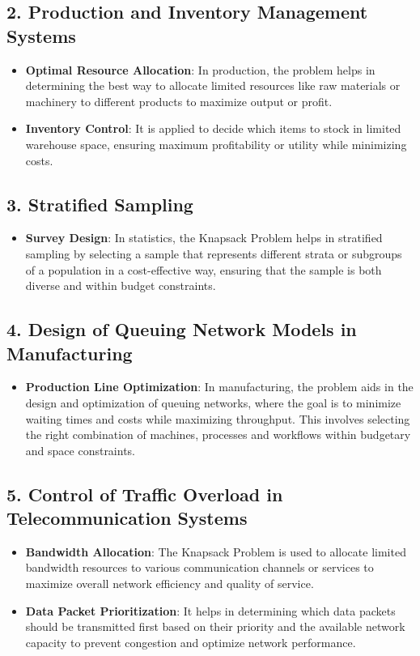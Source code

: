 \documentclass{llncs}
\begin{document}
\subsection*{2. Production and Inventory Management Systems}
\begin{itemize}
    \item \textbf{Optimal Resource Allocation}: In production, the problem helps in
        determining the best way to allocate limited resources like raw materials or machinery
        to different products to maximize output or profit.
    \item \textbf{Inventory Control}: It is applied to decide which items to stock in
        limited warehouse space, ensuring maximum profitability or utility while minimizing costs.
\end{itemize}

\subsection*{3. Stratified Sampling}
\begin{itemize}
    \item \textbf{Survey Design}: In statistics, the Knapsack Problem helps in stratified
        sampling by selecting a sample that represents different strata or subgroups of a population
        in a cost-effective way, ensuring that the sample is both diverse and within budget constraints.
\end{itemize}

\subsection*{4. Design of Queuing Network Models in Manufacturing}
\begin{itemize}
    \item \textbf{Production Line Optimization}: In manufacturing, the problem aids in the design
        and optimization of queuing networks, where the goal is to minimize waiting times and costs
        while maximizing throughput. This involves selecting the right combination of machines, processes
        and workflows within budgetary and space constraints.
\end{itemize}

\subsection*{5. Control of Traffic Overload in Telecommunication Systems}
\begin{itemize}
    \item \textbf{Bandwidth Allocation}: The Knapsack Problem is used to allocate limited bandwidth
        resources to various communication channels or services to maximize overall network efficiency
        and quality of service.
    \item \textbf{Data Packet Prioritization}: It helps in determining which data packets should
        be transmitted first based on their priority and the available network capacity to prevent
        congestion and optimize network performance.
\end{itemize}
\end{document}
